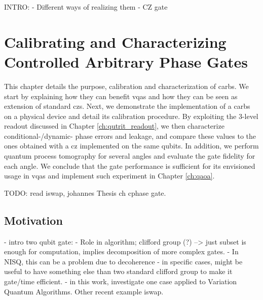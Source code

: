 INTRO: 
	- Different ways of realizing them
	- CZ gate


\chapter{Calibrating and Characterizing Controlled Arbitrary Phase Gates}
This chapter details the purpose, calibration and characterization of \glspl{carb}. We start by explaining how they can benefit \glspl{vqa} and how they can be seen as extension of standard \glspl{cz}. Next, we demonstrate the implementation of a \glspl{carb} on a physical device and detail its calibration procedure. By exploiting the 3-level readout discussed in Chapter \ref{ch:qutrit_readout}, we then characterize conditional-/dynamic- phase errors and leakage, and compare these values to the ones obtained with a \gls{cz} implemented on the same qubits.  In addition, we perform quantum process tomography for several angles and evaluate the gate fidelity for each angle.  We conclude that the gate performance is sufficient for its envisioned usage in \glspl{vqa} and implement such experiment in Chapter \ref{ch:qaoa}.


TODO: read iswap, johannes Thesis ch cphase gate.

\section{Motivation}
- intro two qubit gate: 
	- Role in algorithm; clifford group (?)  --> just subset is enough for computation, implies decomposition of more complex gates. 
	- In NISQ, this can be a problem due to decoherence
- in specific cases, might be useful to have something else than two standard clifford group to make it gate/time efficient. 
- in this work, investigate one case applied to Variation Quantum Algorithms. Other recent example iswap.

